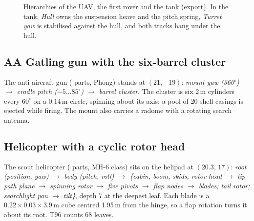 \begin{figure}[h]
\centering
\begin{minipage}[t]{0.31\linewidth}\vspace{0pt}\end{minipage}\hfill
\begin{minipage}[t]{0.31\linewidth}\vspace{0pt}\end{minipage}\hfill
\begin{minipage}[t]{0.35\linewidth}\vspace{0pt}\end{minipage}
\caption{Hierarchies of the UAV, the first rover and the tank (export). In the tank, \emph{Hull} owns the suspension heave and the pitch spring, \emph{Turret yaw} is
stabilised against the hull, and both tracks hang under the hull.}
\label{fig:tree-ground}
\end{figure}

\subsection{AA Gatling gun with the six-barrel cluster}
The anti-aircraft gun (\partsAa{} parts, Phong) stands at $(21,-19)$: \emph{mount yaw (360$^\circ$) $\to$ cradle pitch ($-5\ldots85^\circ$) $\to$ barrel cluster}. The cluster is six
2\,m cylinders every $60^\circ$ on a $0.14$\,m circle, spinning about its axis; a pool of 20 shell casings is ejected while firing. The mount also carries a
radome with a rotating search antenna.

\subsection{Helicopter with a cyclic rotor head}
The scout helicopter (\partsHeli{} parts, MH-6 class) sits on the helipad at $(20.3,\,17)$:
\emph{root (position, yaw) $\to$ body (pitch, roll) $\to$ \{cabin, boom, skids, rotor head $\to$ tip-path plane $\to$
spinning rotor $\to$ five pivots $\to$ flap nodes $\to$ blades; tail rotor; searchlight pan $\to$ tilt\}}, depth 7 at the deepest leaf. Each blade is a $0.22\times0.03\times3.9$\,m cube centred 1.95\,m from the hinge,
so a flap rotation turns it about its root. T96 counts 68 leaves.

